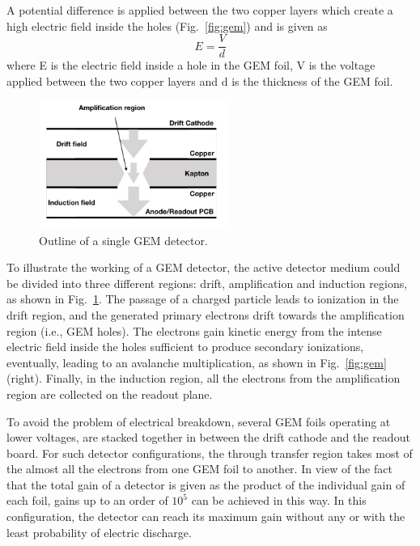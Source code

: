 A potential difference is applied between the two copper layers which create a high electric field inside the holes (Fig.~\ref{fig:gem}) and is given as
\begin{equation}
    E = \frac{V}{d}
\end{equation}
where E is the electric field inside a hole in the GEM foil, V is the voltage applied between the two copper layers and d is the thickness of the GEM foil.
\begin{figure}[htbp]
    \centering
    \includegraphics[width=0.55\textwidth]{figures/GEM/SingleGEM_Detector.jpeg}
    \caption{Outline of a single GEM detector.}
    \label{fig:gemOutline}
\end{figure}

To illustrate the working of a GEM detector, the active detector medium could be divided into three different regions: drift, amplification and induction regions, as shown in Fig.~\ref{fig:gemOutline}.
The passage of a charged particle leads to ionization in the drift region, and the generated primary electrons drift towards the amplification region (i.e., GEM holes). 
The electrons gain kinetic energy from the intense electric field inside the holes sufficient to produce secondary ionizations, eventually, leading to an avalanche multiplication, as shown in Fig.~\ref{fig:gem}(right).
Finally, in the induction region, all the electrons from the amplification region are collected on the readout plane. 

To avoid the problem of electrical breakdown, several GEM foils operating at lower voltages, are stacked together in between the drift cathode and the readout board.
For such detector configurations, the through transfer region takes most of the almost all the electrons from one GEM foil to another.
In view of the fact that the total gain of a detector is given as the product of the individual gain of each foil, gains up to an order of $10^5$ can be achieved in this way.
In this configuration, the detector can reach its maximum gain without any or with the least probability of electric discharge.

